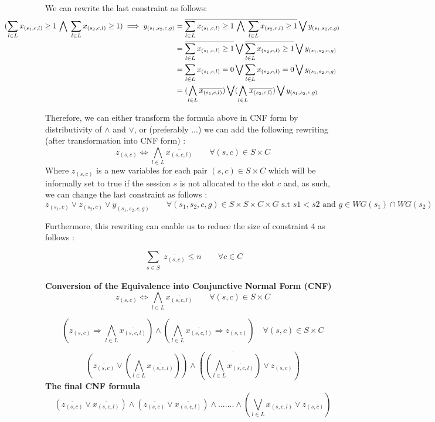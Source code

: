 \documentclass{article}
\begin{document}
We can rewrite the last constraint as  follows:
\begin{equation*} \hspace{-2cm}
\begin{aligned}
(\sum_{l\in L} x_{(s_1,c,l)} \geq 1 \,\bigwedge\; \sum_{l\in L} x_{(s_2,c,l)}\geq 1) \implies y_{(s_1,s_2,c,g)}
& = \overline {\sum_{l\in L} x_{(s_1,c,l)} \geq 1 \,\bigwedge\; \sum_{l\in L} x_{(s_2,c,l)}\geq 1} \bigvee y_{(s_1,s_2,c,g)} \\
& = \overline {\sum_{l\in L} x_{(s_1,c,l)} \geq 1 }\bigvee\overline{ \sum_{l\in L} x_{(s_2,c,l)}\geq 1} \bigvee y_{(s_1,s_2,c,g)}\\
& = \sum_{l\in L} x_{(s_1,c,l)} = 0\bigvee \sum_{l\in L} x_{(s_2,c,l)} = 0\bigvee y_{(s_1,s_2,c,g)}\\
& = (\bigwedge_{l\in L} \overline{x_{(s_1,c,l)}} )\bigvee (\bigwedge_{l\in L} \overline{x_{(s_2,c,l)}})\bigvee
y_{(s_1,s_2,c,g)}
\end{aligned}
\end{equation*}

Therefore, we can either transform the formula above in CNF form by distributivity of $\land$ and $\lor$, or (preferably ...) we can add the following rewriting (after transformation into CNF form) : $$z_{(s,c)}\Leftrightarrow \bigwedge_{l\in L} \overline{x_{(s,c,l)}} \qquad \forall (s,c)\in S\times C$$
Where $z_{(s,c)}$ is a new variables for each pair $(s, c)\in S\times C$ which will be informally set to true if the session $s$ is not allocated to the slot $c$ and, as such, we can change the last constraint as follows : 
$$ z_{(s_1,c)}\vee z_{(s_2,c)} \vee y_{(s_1,s_2,c,g)} \qquad \forall (s_1,s_2,c,g)\in S\times S\times C\times G\text{ s.t } s1<s2\text{ and } g\in WG(s_1)\cap WG(s_2)$$

Furthermore, this rewriting can enable us to reduce the size of constraint 4 as follows :

$$\sum_{\substack{s\in S}} \overline{z_{(s,c)}} \leq n \qquad \forall c \in C$$ 

\newpage



\textbf{Conversion of the Equivalence into Conjunctive Normal Form (CNF)}\\
        $$z_{(s,c)}\Leftrightarrow \bigwedge_{l\in L} \overline{x_{(s,c,l)}} \qquad \forall (s,c)\in S\times C$$
        



$$ \left( z_{(s,c)} \Longrightarrow \bigwedge_{l\in L} \overline{x_{(s,c,l)}} \right) \wedge \left( \bigwedge_{l\in L} \overline{x_{(s,c,l)}} \Longrightarrow z_{(s,c)} \right) \quad \forall (s,c)\in S\times C $$

$$\left(\overline{z_{(s,c)}} \vee \left(\bigwedge_{l\in L} \overline{x_{(s,c,l)}}\right) \right)\wedge \left( \overline{\left(\bigwedge_{l\in L} \overline{x_{(s,c,l)}}\right)} \vee z_{(s,c)} \right)  $$
\textbf{The final CNF formula}\\
$$\left(\overline{z_{(s,c)}} \vee \overline{x_{(s,c,l)}}\right)
 \wedge \left(\overline{z_{(s,c)}} \vee \overline{x_{(s,c,l)}}\right)\wedge ....... \wedge \left(\bigvee_{l\in L} x_{(s,c,l)} \vee z_{(s,c)}\right)$$
    
\end{document}

